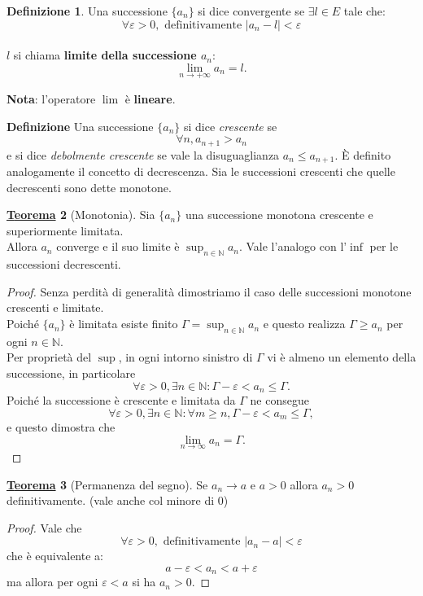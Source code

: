 \documentclass[a4paper,twoside]{article}
\renewcommand{\epsilon}{\varepsilon}
\newcommand{\N}{\mathbb{N}}
\theoremstyle{definition}
\newtheorem{theorem}{\color{Red}\underline{\textrm Teorema}}
\newtheorem{definizione}[theorem]{Definizione}
\numberwithin{theorem}{section}
\begin{document}
\begin{definizione}
Una successione $\{a_n\}$ si dice convergente se $\exists l\in E$ tale che: $$\forall \epsilon>0,\text{ definitivamente } |a_n-l|<\epsilon$$ \\
$l$ si chiama \textbf{limite della successione $a_n$}:
$$\lim_{n\to+\infty}a_n=l.$$
\end{definizione}

\textbf{Nota}: l'operatore $\lim$ è \textbf{lineare}.

\textbf{Definizione}
Una successione $\{a_n\}$ si dice \emph{crescente} se $$\forall n, a_{n+1} > a_n$$
 e si dice \emph{debolmente crescente} se vale la disuguaglianza $a_n\leq a_{n+1}$. È definito analogamente il concetto di decrescenza. Sia le successioni crescenti che quelle decrescenti sono dette monotone.\\
 
 
\begin{theorem}[Monotonia]
Sia $\{a_n\}$ una successione monotona crescente e superiormente limitata.\\ Allora $a_n$ converge e il suo limite è $\sup_{n\in\N} a_n$. Vale l'analogo con l'$\inf$ per le successioni decrescenti.
\end{theorem}
\begin{proof} Senza perdità di generalità dimostriamo il caso delle successioni monotone crescenti e limitate. \\
Poiché $\{a_n\}$ è limitata esiste finito $\Gamma=\sup_{n\in\N}a_n$ e questo realizza $\Gamma \geq a_n$ per ogni $n\in\N$.\\
Per proprietà del $\sup$, in ogni intorno sinistro di $\Gamma$ vi è almeno un elemento della successione, in particolare
$$ \forall \epsilon > 0, \exists n\in \N: \Gamma-\epsilon < a_n \leq \Gamma. $$
Poiché la successione è crescente e limitata da $\Gamma$ ne consegue
$$ \forall \epsilon > 0, \exists n\in \N: \forall m\geq n, \Gamma-\epsilon < a_m \leq \Gamma, $$
e questo dimostra che 
$$\lim_{n\to\infty}a_n = \Gamma.$$
\end{proof}


\begin{theorem}[Permanenza del segno]
Se $a_n \to a$ e $a>0$ allora $a_n>0$ definitivamente.
(vale anche col minore di 0)
\end{theorem}
\begin{proof}
Vale che $$\forall\epsilon>0,\text{ definitivamente }|a_n-a|<\epsilon$$
che è equivalente a:
$$a-\epsilon<a_n<a+\epsilon$$
ma allora per ogni $\epsilon < a$ si ha $a_n>0$.
\end{proof}
\end{document}
